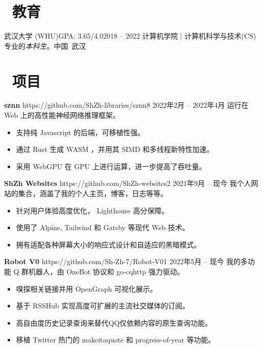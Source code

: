 \documentclass{common}
\begin{document}

\section{\faGraduationCap\ 教育}
\educationsubsection
    {武汉大学 (WHU)}{GPA: 3.65/4.0}{2018 -- 2022}
    {计算机学院 | 计算机科学与技术(CS)专业的\textit{本科生}。}{中国\ 武汉}

\section{\faCubes\ 项目}
\projectsubsection
    {\textbf{sznn}}
    {https://github.com/ShZh-libraries/sznn}{8}
    {2022年2月 -- 2022年4月}
运行在 Web 上的高性能神经网络推理框架。
\begin{itemize}
    \item 支持纯 Javascript 的后端，可移植性强。
    \item 通过 Rust 生成 WASM ，并用其 SIMD 和多线程新特性加速。
    \item 采用 WebGPU 在 GPU 上进行运算，进一步提高了吞吐量。
\end{itemize}
\projectsubsection
    {\textbf{ShZh Websites}}
    {https://github.com/ShZh-websites}{2}
    {2021年9月 -- 现今}
我个人网站的集合，涵盖了我的个人主页，博客，日志等等。
\begin{itemize}
    \item 针对用户体验高度优化， Lighthouse 高分保障。
    \item 使用了 Alpine, Tailwind 和 Gatsby 等现代 Web 技术。
    \item 拥有适配各种屏幕大小的响应式设计和自适应的黑暗模式。
\end{itemize}
\projectsubsection
    {\textbf{Robot V0}}
    {https://github.com/Sh-Zh-7/Robot-V0}{1}
    {2022年5月 -- 现今}
我的多功能 Q 群机器人，由 OneBot 协议和 go-cqhttp 强力驱动。
\begin{itemize}
    \item 嗅探相关链接并用 OpenGraph 可视化展示。
    \item 基于 RSSHub 实现高度可扩展的主流社交媒体的订阅。
    \item 高自由度历史记录查询来替代QQ仅依赖内容的原生查询功能。
    \item 移植 Twitter 热门的 makeitaquote 和 progress-of-year 等功能。
\end{itemize}
\end{document}
